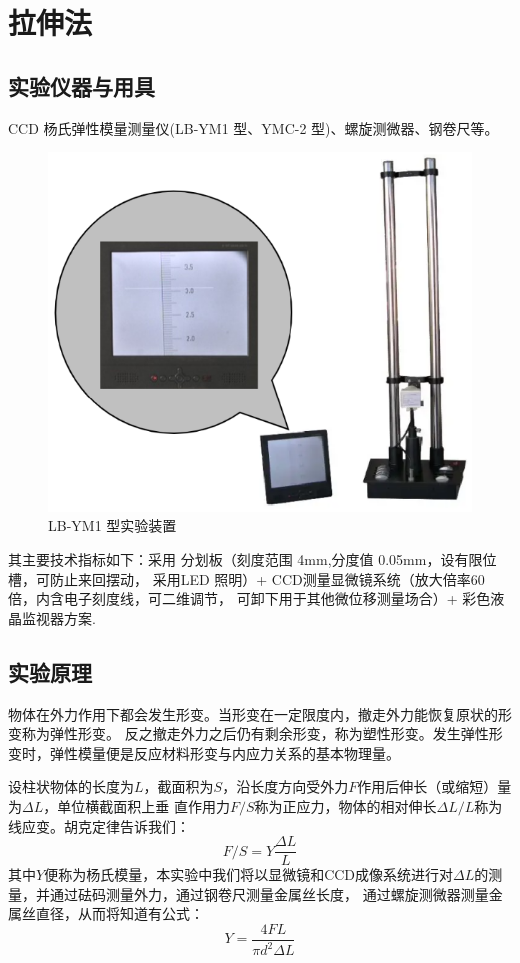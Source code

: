 \documentclass[UTF8]{article}
\theoremstyle{MyLineTheoremStyle} %
\theoremstyle{MyBlockTheoremStyle} %
\theoremstyle{MySubsubsectionStyle} %
\begin{document}
\section{拉伸法}
\subsection{实验仪器与用具}

CCD 杨氏弹性模量测量仪(LB-YM1 型、YMC-2 型)、螺旋测微器、钢卷尺等。
\begin{figure}[H]\centering
    \includegraphics[width=0.4\columnwidth]{assets/0/da2dd09fb93428ae0fb1bc23c8c81af2.png}
    \caption{LB-YM1 型实验装置}
\end{figure}

其主要技术指标如下：采用
分划板（刻度范围 4mm,分度值 0.05mm，设有限位槽，可防止来回摆动，
采用LED 照明）+
CCD测量显微镜系统（放大倍率60倍，内含电子刻度线，可二维调节，
可卸下用于其他微位移测量场合）+
彩色液晶监视器方案.

\subsection{实验原理}
物体在外力作用下都会发生形变。当形变在一定限度内，撤走外力能恢复原状的形变称为弹性形变。
反之撤走外力之后仍有剩余形变，称为塑性形变。发生弹性形变时，弹性模量便是反应材料形变与内应力关系的基本物理量。

设柱状物体的长度为$L$，截面积为$S$，沿长度方向受外力$F$作用后伸长（或缩短）量为$\Delta L$，单位横截面积上垂
直作用力$F/S$称为正应力，物体的相对伸长$\Delta L/L$称为线应变。胡克定律告诉我们：
\begin{equation}
   F/S=Y\frac{\Delta L}{L} 
\end{equation}
其中$Y$便称为杨氏模量，本实验中我们将以显微镜和CCD成像系统进行对$\Delta L$的测量，并通过砝码测量外力，通过钢卷尺测量金属丝长度，
通过螺旋测微器测量金属丝直径，从而将知道有公式：
\begin{equation}
    Y=\frac{4FL}{\pi d^2\Delta L}
\end{equation}
\end{document}
